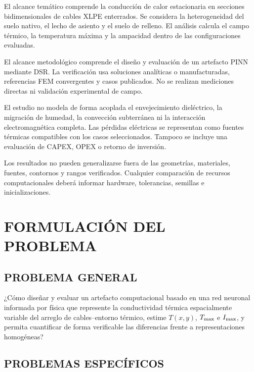 El alcance temático comprende la conducción de calor estacionaria en secciones bidimensionales de cables XLPE enterrados. Se considera la heterogeneidad del suelo nativo, el lecho de asiento y el suelo de relleno. El análisis calcula el campo térmico, la temperatura máxima y la ampacidad dentro de las configuraciones evaluadas.

El alcance metodológico comprende el diseño y evaluación de un artefacto PINN mediante DSR. La verificación usa soluciones analíticas o manufacturadas, referencias FEM convergentes y casos publicados. No se realizan mediciones directas ni validación experimental de campo.

El estudio no modela de forma acoplada el envejecimiento dieléctrico, la migración de humedad, la convección subterránea ni la interacción electromagnética completa. Las pérdidas eléctricas se representan como fuentes térmicas compatibles con los casos seleccionados. Tampoco se incluye una evaluación de CAPEX, OPEX o retorno de inversión.

Los resultados no pueden generalizarse fuera de las geometrías, materiales, fuentes, contornos y rangos verificados. Cualquier comparación de recursos computacionales deberá informar hardware, tolerancias, semillas e inicializaciones.

\section{FORMULACIÓN DEL PROBLEMA}
\label{sec:formulacion-problema}

\subsection{PROBLEMA GENERAL}

¿Cómo diseñar y evaluar un artefacto computacional basado en una red neuronal informada por física que represente la conductividad térmica espacialmente variable del arreglo de cables--entorno térmico, estime $T(x,y)$, $T_{\max}$ e $I_{\max}$, y permita cuantificar de forma verificable las diferencias frente a representaciones homogéneas?

\subsection{PROBLEMAS ESPECÍFICOS}

